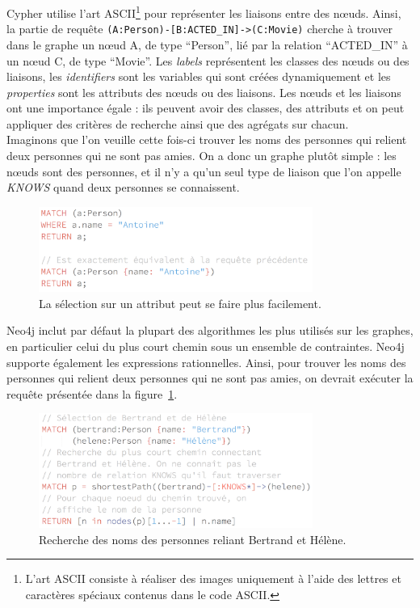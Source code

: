 		Cypher utilise l'art ASCII\footnote{L'art ASCII consiste à réaliser des images uniquement à l'aide des lettres et caractères spéciaux contenus dans le code ASCII.\cite{Wikipedia_artASCII}} pour représenter les liaisons entre des nœuds. Ainsi, la partie de requête \texttt{(A:Person)-[B:ACTED\_IN]->(C:Movie)} cherche à trouver dans le graphe un nœud A, de type \enquote{Person}, lié par la relation \enquote{ACTED\_IN} à un nœud C, de type \enquote{Movie}. Les \textit{labels} représentent les classes des nœuds ou des liaisons, les \textit{identifiers} sont les variables qui sont créées dynamiquement et les \textit{properties} sont les attributs des nœuds ou des liaisons. Les nœuds et les liaisons ont une importance égale : ils peuvent avoir des classes, des attributs et on peut appliquer des critères de recherche ainsi que des agrégats sur chacun.\\

		Imaginons que l'on veuille cette fois-ci trouver les noms des personnes qui relient deux personnes qui ne sont pas amies. On a donc un graphe plutôt simple : les nœuds sont des personnes, et il n'y a qu'un seul type de liaison que l'on appelle \textit{KNOWS} quand deux personnes se connaissent.

		\begin{figure}[H]
			\centering
			\includegraphics[width=0.8\textwidth]{images/shortSelect.png}
			\caption{La sélection sur un attribut peut se faire plus facilement.}
		\end{figure}

		Neo4j inclut par défaut la plupart des algorithmes les plus utilisés sur les graphes, en particulier celui du plus court chemin sous un ensemble de contraintes. Neo4j supporte également les expressions rationnelles. Ainsi, pour trouver les noms des personnes qui relient deux personnes qui ne sont pas amies, on devrait exécuter la requête présentée dans la figure~\ref{connectingFriends}.
		\begin{figure}[H]
			\centering
			\includegraphics[width=0.8\textwidth]{images/connectingFriends.png}
			\caption{Recherche des noms des personnes reliant Bertrand et Hélène.}
			\label{connectingFriends}
		\end{figure}

